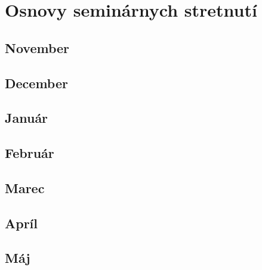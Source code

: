 \chapter{Osnovy seminárnych stretnutí}







\section{November}





\section{December}





\section{Január}




\section{Február}




\section{Marec}





\section{Apríl}





\section{Máj}



